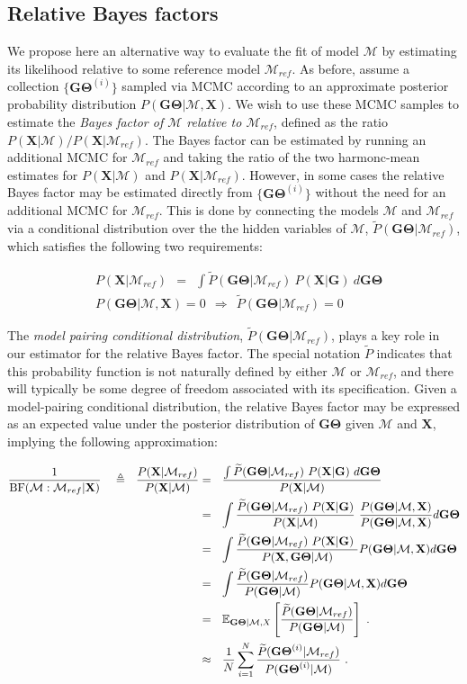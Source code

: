 \documentclass[11pt]{article}
\newcommand{\vect}[1]{\boldsymbol{\mathbf{#1}}}
\newcommand{\E}{\mathbb{E}}
\newcommand{\X}{\vect{X}}
\newcommand{\M}{\mathcal{M}}
\newcommand{\G}{\vect{G}}
\newcommand{\T}{\vect{\Theta}}
\newcommand{\GT}{\G\T}
\newcommand{\Mref}{\M_{ref}}
\newcommand{\Pref}{\widetilde{P}}
\newcommand{\rbf}{\text{BF}}
\newcommand{\1}{\mathbbm{1}}
\begin{document}
\subsection{Relative Bayes factors}
\label{Relative Bayes factors}

We propose here an alternative way to evaluate the fit of model $\M$ by estimating its likelihood relative to some
reference model $\Mref$. 
%
As before, assume a collection $\{\GT^{(i)}\}$ sampled via MCMC according to an approximate posterior probability distribution $P(\GT|\M,\X)$.
%
We wish to use these MCMC samples to estimate the {\em Bayes factor of $\M$ relative to $\Mref$}, defined as the ratio $P(\X|\M) / P(\X|\Mref)$.
%
The Bayes factor can be estimated by running an additional MCMC for $\Mref$ and taking the ratio of the two harmonc-mean estimates for $P(\X|\M)$ and $P(\X|\Mref)$.
%
However, in some cases the relative Bayes factor may be estimated directly from $\{\GT^{(i)}\}$ without the need for an additional MCMC for $\Mref$.
%
This is done by connecting the models $\M$ and $\Mref$ via a conditional distribution over the the hidden variables of $\M$, $\Pref(\GT|\Mref)$,
which satisfies the following two requirements:
%
%
\begin{small}
\begin{align}
&P(\X|\Mref) ~~=~~ \int  \Pref(\GT|\Mref)\ P(\X|\G)\ d\GT \label{eq:pref_integral}\\
&P(\GT|\M,\X)=0 ~~\Rightarrow~~ \Pref(\GT|\Mref)=0 \label{eq:pref_support}
\end{align}
\end{small}
%
%


The \emph{model pairing conditional distribution}, $\Pref(\GT|\Mref)$, plays a key role in our estimator for the relative Bayes factor.
%
The special notation $\Pref$ indicates that this probability function is not naturally defined by either
$\M$ or $\Mref$, and there will typically be some degree of freedom associated with its specification.
%
Given a model-pairing conditional distribution, the relative Bayes factor  may be expressed as an expected value under the posterior distribution of $\GT$ given $\M$ and $\X$,
implying the following approximation:
%
%
\begin{small}
\begin{align}
\frac{1}{\rbf(\M:\Mref|\X)} ~~~ \triangleq ~~ \frac{P(\X|\Mref)}{P(\X|\M)}
&=~~ \frac{\int  \Pref(\GT|\Mref)\ P(\X|\G)\ d\GT}{P(\X|\M)} \label{eq:pref1} \\ %
&=~~ \int \frac{\Pref(\GT|\Mref)\ P(\X|\G) }{P(\X|\M)} \ \frac{P(\GT|\M, \X)}{P(\GT|\M, \X)}  d\GT \label{eq:pref2} \\ %
&=~~ \int \frac{\Pref(\GT|\Mref)\ P(\X|\G)\ }{P(\X,\GT|\M)} P(\GT|\M, \X)  d\GT \notag \\ %
&=~~ \int \frac{\Pref(\GT|\Mref) }{P(\GT|\M)} P(\GT|\M, \X)  d\GT  \label{eq:data_cancel}\\ %
&=~~ \E_{\GT|\M,X } \left[\frac{\Pref(\GT|\Mref) }{P(\GT|\M)}\right]~.\notag \\
&\approx~~ \frac{1}{N} \sum_{i=1}^{N}\frac{\Pref(\GT^{(i)}|\Mref) }{P(\GT^{(i)}|\M)} ~.\label{eq:rbf}
\end{align}
\end{small}
%
%
\end{document}

